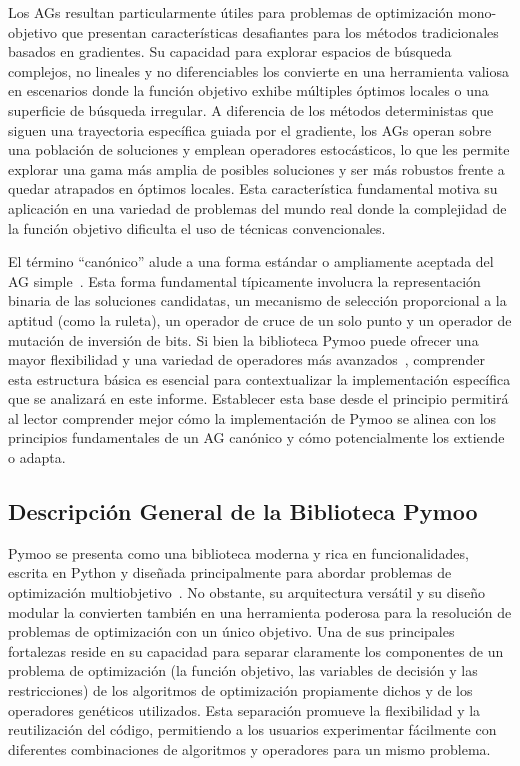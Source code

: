 Los AGs resultan particularmente útiles para problemas de optimización mono-objetivo que presentan características desafiantes para los métodos tradicionales basados en gradientes. Su capacidad para explorar espacios de búsqueda complejos, no lineales y no diferenciables los convierte en una herramienta valiosa en escenarios donde la función objetivo exhibe múltiples óptimos locales o una superficie de búsqueda irregular. A diferencia de los métodos deterministas que siguen una trayectoria específica guiada por el gradiente, los AGs operan sobre una población de soluciones y emplean operadores estocásticos, lo que les permite explorar una gama más amplia de posibles soluciones y ser más robustos frente a quedar atrapados en óptimos locales. Esta característica fundamental motiva su aplicación en una variedad de problemas del mundo real donde la complejidad de la función objetivo dificulta el uso de técnicas convencionales.

El término ``canónico'' alude a una forma estándar o ampliamente aceptada del AG simple~\cite{goldberg1989}. Esta forma fundamental típicamente involucra la representación binaria de las soluciones candidatas, un mecanismo de selección proporcional a la aptitud (como la ruleta), un operador de cruce de un solo punto y un operador de mutación de inversión de bits. Si bien la biblioteca Pymoo puede ofrecer una mayor flexibilidad y una variedad de operadores más avanzados~\cite{blank2020}, comprender esta estructura básica es esencial para contextualizar la implementación específica que se analizará en este informe. Establecer esta base desde el principio permitirá al lector comprender mejor cómo la implementación de Pymoo se alinea con los principios fundamentales de un AG canónico y cómo potencialmente los extiende o adapta.

\subsection{Descripción General de la Biblioteca Pymoo}

Pymoo se presenta como una biblioteca moderna y rica en funcionalidades, escrita en Python y diseñada principalmente para abordar problemas de optimización multiobjetivo~\cite{blank2020}. No obstante, su arquitectura versátil y su diseño modular la convierten también en una herramienta poderosa para la resolución de problemas de optimización con un único objetivo. Una de sus principales fortalezas reside en su capacidad para separar claramente los componentes de un problema de optimización (la función objetivo, las variables de decisión y las restricciones) de los algoritmos de optimización propiamente dichos y de los operadores genéticos utilizados. Esta separación promueve la flexibilidad y la reutilización del código, permitiendo a los usuarios experimentar fácilmente con diferentes combinaciones de algoritmos y operadores para un mismo problema.

